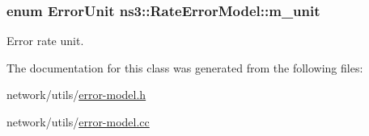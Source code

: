 \subsubsection[{\texorpdfstring{m\+\_\+unit}{m_unit}}]{\setlength{\rightskip}{0pt plus 5cm}enum {\bf Error\+Unit} ns3\+::\+Rate\+Error\+Model\+::m\+\_\+unit\hspace{0.3cm}{\ttfamily [private]}}\hypertarget{classns3_1_1RateErrorModel_a75b25e124364618bf15d66d0634c9cd4}{}\label{classns3_1_1RateErrorModel_a75b25e124364618bf15d66d0634c9cd4}


Error rate unit. 



The documentation for this class was generated from the following files\+:\begin{DoxyCompactItemize}
\item 
network/utils/\hyperlink{error-model_8h}{error-\/model.\+h}\item 
network/utils/\hyperlink{error-model_8cc}{error-\/model.\+cc}\end{DoxyCompactItemize}
